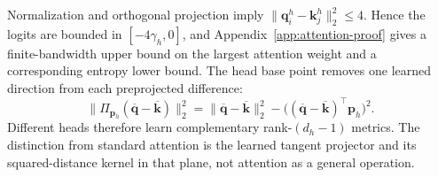 Normalization and orthogonal projection imply 
$\|\mathbf q_i^h-\mathbf k_j^h\|_2^2\leq4$. Hence the logits are bounded in $[-4\gamma_h,0]$, and Appendix~\ref{app:attention-proof} gives a finite-bandwidth upper bound on the largest attention weight and a corresponding entropy lower bound. The head base point removes one learned direction from each preprojected difference:
\begin{equation}
\|\Pi_{\mathbf p_h}(\overline{\mathbf q}-\overline{\mathbf k})\|_2^2
=\|\overline{\mathbf q}-\overline{\mathbf k}\|_2^2
-\big((\overline{\mathbf q}-\overline{\mathbf k})^\top\mathbf p_h\big)^2.
\label{eq:head-geometry}
\end{equation}
Different heads therefore learn complementary rank-$(d_h-1)$ metrics. The distinction from standard attention \citep{vaswani2017attention} is the learned tangent projector and its squared-distance kernel in that plane, not attention as a general operation.

